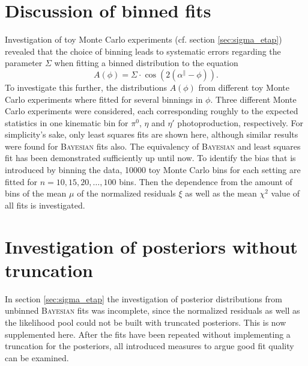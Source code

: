 \chapter{Discussion of binned fits}
\label{app:binnedfits}
Investigation of toy Monte Carlo experiments (cf. section \ref{sec:sigma_etap}) revealed that the choice of binning leads to systematic errors regarding the parameter $\Sigma$ when fitting a binned distribution to the equation 
\begin{equation}
	A\left(\phi\right)=\Sigma\cdot\cos\left(2\left(\alpha^\parallel-\phi\right)\right).
\end{equation}
To investigate this further, the distributions $A\left(\phi\right)$ from different toy Monte Carlo experiments where fitted for several binnings in $\phi$. Three different Monte Carlo experiments were considered, each corresponding roughly to the expected statistics in one kinematic bin for $\pi^0$, $\eta$ and $\eta'$ photoproduction, respectively. For simplicity's sake, only least squares fits are shown here, although similar results were found for \textsc{Bayesian} fits also. The equivalency of \textsc{Bayesian} and least squares fit has been demonstrated sufficiently up until now. To identify the bias that is introduced by binning the data, 10000 toy Monte Carlo bins for each setting are fitted for $n=10,15,20,\dots,100$ bins. Then the dependence from the amount of bins of the mean $\mu$ of the normalized residuals $\xi$ as well as the mean $\chi^2$ value of all fits is investigated.
\chapter{Investigation of posteriors without truncation}
\label{app:trunc}
In section \ref{sec:sigma_etap} the investigation of posterior distributions from unbinned \textsc{Bayesian} fits was incomplete, since the normalized residuals as well as the likelihood pool could not be built with truncated posteriors. This is now supplemented here. After the fits have been repeated without implementing a truncation for the posteriors, all introduced measures to argue good fit quality can be examined.